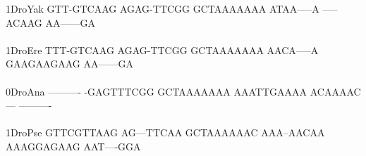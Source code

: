 \documentclass[11pt,twoside,reqno,a4paper]{article}
\begin{document}
{1\hspace*{3\charwidth}DroYak	GTT-GTCAAG	AGAG-TTCGG	GCTAAAAAAA	ATAA-----A	-----ACAAG	AA------GA	\\
\hspace*{4\charwidth}\hspace*{7\charwidth}\hspace*{1\charwidth}\hspace*{1\charwidth}\hspace*{1\charwidth}\hspace*{1\charwidth}\hspace*{1\charwidth}\hspace*{1\charwidth}\\
1\hspace*{3\charwidth}DroEre	TTT-GTCAAG	AGAG-TTCGG	GCTAAAAAAA	AACA-----A	GAAGAAGAAG	AA------GA	\\
\hspace*{4\charwidth}\hspace*{7\charwidth}\hspace*{1\charwidth}\hspace*{1\charwidth}\hspace*{1\charwidth}\hspace*{1\charwidth}\hspace*{1\charwidth}\hspace*{1\charwidth}\\
0\hspace*{3\charwidth}DroAna	----------	-GAGTTTCGG	GCTAAAAAAA	AAATTGAAAA	ACAAAAC---	----------	\\
\hspace*{4\charwidth}\hspace*{7\charwidth}\hspace*{1\charwidth}\hspace*{1\charwidth}\hspace*{1\charwidth}\hspace*{1\charwidth}\hspace*{1\charwidth}\hspace*{1\charwidth}\\
1\hspace*{3\charwidth}DroPse	GTTCGTTAAG	AG---TTCAA	GCTAAAAAAC	AAA--AACAA	AAAGGAGAAG	AAT----GGA	\\
\hspace*{4\charwidth}\hspace*{7\charwidth}\hspace*{1\charwidth}\hspace*{1\charwidth}\hspace*{1\charwidth}\hspace*{1\charwidth}\hspace*{1\charwidth}\hspace*{1\charwidth}\\
}
\end{document}
